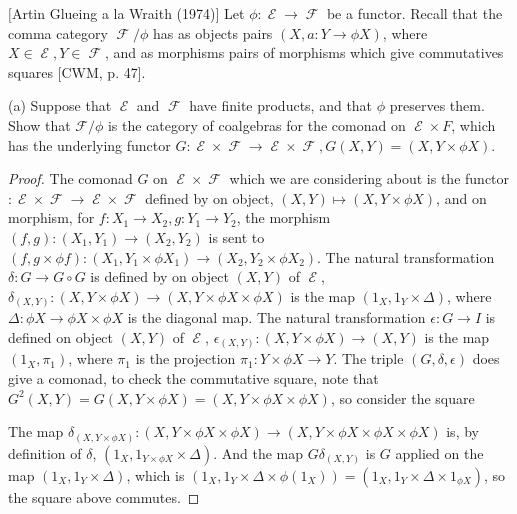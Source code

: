 \documentclass[a4paper]{article}
\DeclareMathOperator{\E}{\mathcal E}
\DeclareMathOperator{\F}{\mathcal F}
\begin{document}
\begin{question}
    $[$Artin Glueing a la Wraith (1974)$]$ Let $\phi:\E\to \F$ be a functor. Recall that the comma category $\F/\phi$ has as objects pairs $(X,a:Y\to \phi X)$, where $X\in \E,Y\in \F$, and as morphisms pairs of morphisms which give commutatives squares [CWM, p. 47].
\end{question}

(a) Suppose that $\E$ and $\F$ have finite products, and that $\phi$ preserves them. Show that $\mathcal F/\phi$ is the category of coalgebras for the comonad on $\E\times F$, which has the underlying functor $G:\E\times \F\to \E\times \F, G(X,Y)=(X,Y\times \phi X)$.
\begin{proof}
    The comonad $G$ on $\E\times \F$ which we are considering about is the functor $:\E\times \F\to \E\times \F$ defined by on object, $(X,Y)\mapsto (X,Y\times \phi X)$, and on morphism, for $f:X_1\to X_2,g:Y_1\to Y_2$, the morphism $(f,g):(X_1,Y_1)\to (X_2,Y_2)$ is sent to $(f,g\times \phi f):(X_1,Y_1\times \phi X_1)\to (X_2,Y_2\times \phi X_2)$. The natural transformation $\delta:G\to G\circ G$ is defined by on object $(X,Y)$ of $\E$, $\delta_{(X,Y)}:(X,Y\times \phi X)\to (X,Y\times \phi X\times \phi X)$ is the map $(1_X,1_Y\times \Delta)$, where $\Delta:\phi X\to \phi X\times \phi X$ is the diagonal map. The natural transformation $\epsilon :G\to I$ is defined on object $(X,Y)$ of $\E$, $\epsilon_{(X,Y)}:(X,Y\times \phi X)\to (X,Y)$ is the map $(1_X,\pi_1)$, where $\pi_1$ is the projection $\pi_1:Y\times \phi X\to Y$. The triple $(G,\delta,\epsilon)$ does give a comonad, to check the commutative square, note that $G^2(X,Y)=G(X,Y\times \phi X) = (X,Y\times \phi X\times \phi X)$, so consider the square
    \begin{center}
    \end{center}

    The map $\delta_{(X,Y\times \phi X)}:(X,Y\times \phi X\times \phi X)\to (X,Y\times \phi X\times \phi X\times \phi X)$ is, by definition of $\delta$, $(1_X,1_{Y\times \phi X}\times \Delta)$. And the map $G\delta_{(X,Y)}$ is $G$ applied on the map $(1_X,1_Y\times\Delta)$, which is $(1_X,1_Y\times\Delta\times \phi(1_X))= (1_X,1_Y\times\Delta\times 1_{\phi X})$, so the square above commutes.


\end{proof}
\end{document}
